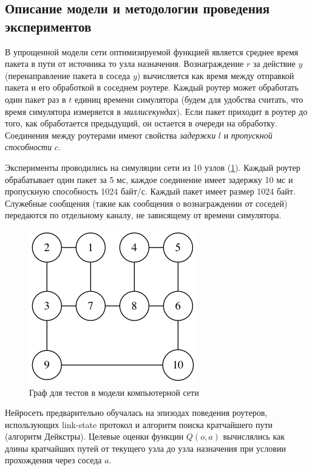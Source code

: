 \documentclass[specification, annotation]{itmo-student-thesis}
\begin{document}
\subsection{Описание модели и методологии проведения экспериментов}\label{experiments:simple/desc}

В упрощенной модели сети оптимизируемой функцией является среднее время пакета в
пути от источника то узла назначения. Вознаграждение $r$ за действие $y$
(перенаправление пакета в соседа $y$) вычисляется как время между отправкой
пакета и его обработкой в соседнем роутере. Каждый роутер может обработать один
пакет раз в $t$ единиц времени симулятора (будем для удобства считать, что время
симулятора измеряется в \textit{миллисекундах}). Если пакет приходит в роутер до
того, как обработается предыдущий, он остается в очереди на обработку.
Соединения между роутерами имеют свойства \textit{задержки} $l$ и \textit{пропускной
  способности} $c$.

Эксперименты проводились на симуляции сети из 10 узлов
(\ref{fig-simple-network}). Каждый роутер обрабатывает один пакет за 5 мс,
каждое соединение имеет задержку 10 мс и пропускную способность 1024 байт/с.
Каждый пакет имеет размер 1024 байт. Служебные сообщения (такие как сообщения о
вознаграждении от соседей) передаются по отдельному каналу, не зависящему от
времени симулятора. 

\begin{figure}[!h]
  \caption{Граф для тестов в модели компьютерной сети}\label{fig-simple-network}
  \centering
  \includegraphics[scale=0.6]{graph-2.png}
\end{figure}

Нейросеть предварительно обучалась на эпизодах поведения роутеров, использующих
link-state протокол и алгоритм поиска кратчайшего пути (алгоритм Дейкстры).
Целевые оценки функции $Q(o, a)$ вычислялись как длины кратчайших путей от
текущего узла до узла назначения при условии прохождения через соседа $a$.
\end{document}
